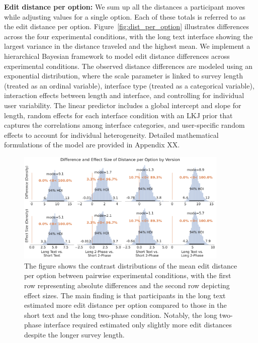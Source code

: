 \textbf{Edit distance per option:} We sum up all the distances a participant moves while adjusting values for a single option. Each of these totals is referred to as the edit distance per option. Figure~\ref{fig:dist_per_option} illustrates differences across the four experimental conditions, with the long text interface showing the largest variance in the distance traveled and the highest mean. We implement a hierarchical Bayesian framework to model edit distance differences across experimental conditions. The observed distance differences are modeled using an exponential distribution, where the scale parameter is linked to survey length (treated as an ordinal variable), interface type (treated as a categorical variable), interaction effects between length and interface, and controlling for individual user variability. The linear predictor includes a global intercept and slope for length, random effects for each interface condition with an LKJ prior that captures the correlations among interface categories, and user-specific random effects to account for individual heterogeneity. Detailed mathematical formulations of the model are provided in Appendix XX. 

\begin{figure}[ht]
    \centering
    \includegraphics[width=0.9\textwidth]{content/image/distance/distance_diff_per_option_effect_size_by_version.pdf}
    \caption{The figure shows the contrast distributions of the mean edit distance per option between pairwise experimental conditions, with the first row representing absolute differences and the second row depicting effect sizes. The main finding is that participants in the long text estimated more edit distance per option compared to those in the short text and the long two-phase condition. Notably, the long two-phase interface required estimated only slightly more edit distances despite the longer survey length.}
    \label{fig:dist_per_option_bayesian}
\end{figure}


